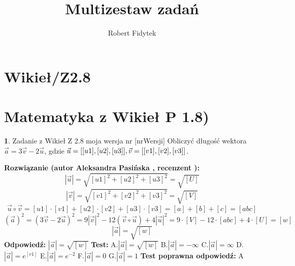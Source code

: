 \documentclass[12pt, a4paper]{article}
\title{Multizestaw zadań}
\author{Robert Fidytek}
\date{}
\theoremstyle{definition} %
\newtheorem{zad}{}
\newcommand{\kategoria}[1]{\section{#1}} %
\newcommand{\zadStart}[1]{\begin{zad}#1\newline} %
\newcommand{\zadStop}{\end{zad}}   %
\newcommand{\rozwStart}[2]{\noindent \textbf{Rozwiązanie (autor #1 , recenzent #2): }\newline} %
\newcommand{\rozwStop}{\newline}                                            %
\newcommand{\odpStart}{\noindent \textbf{Odpowiedź:}\newline}    %
\newcommand{\odpStop}{\newline}                                             %
\newcommand{\testStart}{\noindent \textbf{Test:}\newline} %
\newcommand{\testStop}{\newline} %
\newcommand{\kluczStart}{\noindent \textbf{Test poprawna odpowiedź:}\newline} %
\newcommand{\kluczStop}{\newline} %
\begin{document}
\maketitle


\kategoria{Wikieł/Z2.8}
\kategoria{Matematyka z Wikieł P 1.8)}
\zadStart{Zadanie z Wikieł Z 2.8 moja wersja nr [nrWersji]}
Obliczyć długość wektora $\vec a=3\vec v-2\vec u$, gdzie $\vec u=[[u1],[u2],[u3]],\\ \vec v=[[v1],[v2],[v3]]$.
\zadStop
\rozwStart{Aleksandra Pasińska}{}
$$|\vec u|=\sqrt{[u1]^2+[u2]^2+[u3]^2}=\sqrt{[U]}$$ 
$$|\vec v|=\sqrt{[v1]^2+[v2]^2+[v3]^2}=\sqrt{[V]}$$ 
$$\vec u\circ \vec v=[u1]\cdot [v1]+[u2]\cdot [v2]+[u3]\cdot [v3]=[a]+[b]+[c]=[abc]$$
$$(\vec a)^2=(3\vec v-2\vec u)^2=9|\vec v|^2-12(\vec v \circ \vec u)+4|\vec u|^2=9\cdot [V]-12\cdot [abc]+4\cdot [U]=[w]$$
$$|\vec a|=\sqrt{[w]}$$
\rozwStop
\odpStart
$|\vec a|=\sqrt{[w]}$
\odpStop
\testStart
A.$|\vec a|=\sqrt{[w]}$
B.$|\vec a|=-\infty$
C.$|\vec a|=\infty$
D.$|\vec a|=e^{[v1]}$
E.$|\vec a|=e^{-2}$
F.$|\vec a|=0$
G.$|\vec a|=1$
\testStop
\kluczStart
A
\kluczStop
\end{document}
